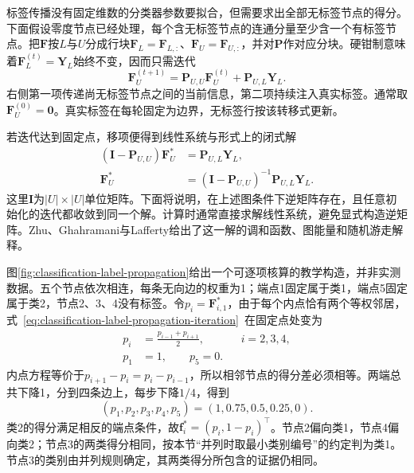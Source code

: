 标签传播没有固定维数的分类器参数要拟合，但需要求出全部无标签节点的得分。下面假设零度节点已经处理，每个含无标签节点的连通分量至少含一个有标签节点。把$\bm{F}$按$L$与$U$分成行块$\bm{F}_L=\bm{F}_{L,:}$、$\bm{F}_U=\bm{F}_{U,:}$，并对$\bm{P}$作对应分块。硬钳制意味着$\bm{F}_L^{(t)}=\bm{Y}_L$始终不变，因而只需迭代
\begin{equation}
  \label{eq:classification-label-propagation-iteration}
  \bm{F}_U^{(t+1)}
    =\bm{P}_{U,U}\bm{F}_U^{(t)}
     +\bm{P}_{U,L}\bm{Y}_L.
\end{equation}
右侧第一项传递尚无标签节点之间的当前信息，第二项持续注入真实标签。通常取$\bm{F}_U^{(0)}=\bm{0}$。真实标签在每轮固定为边界，无标签行按该转移式更新。

若迭代达到固定点，移项便得到线性系统与形式上的闭式解
\begin{equation}
  \label{eq:classification-label-propagation-solution}
  \begin{aligned}
    (\bm{I}-\bm{P}_{U,U})\bm{F}_U^\ast
      &=\bm{P}_{U,L}\bm{Y}_L,\\
    \bm{F}_U^\ast
      &=(\bm{I}-\bm{P}_{U,U})^{-1}
        \bm{P}_{U,L}\bm{Y}_L.
  \end{aligned}
\end{equation}
这里$\bm{I}$为$|U|\times|U|$单位矩阵。下面将说明，在上述图条件下逆矩阵存在，且任意初始化的迭代都收敛到同一个解。计算时通常直接求解线性系统，避免显式构造逆矩阵。Zhu、Ghahramani与Lafferty给出了这一解的调和函数、图能量和随机游走解释。

图\ref{fig:classification-label-propagation}给出一个可逐项核算的教学构造，并非实测数据。五个节点依次相连，每条无向边的权重为1；端点1固定属于类1，端点5固定属于类2，节点2、3、4没有标签。令$p_i=\bm{F}_{i,1}^\ast$，由于每个内点恰有两个等权邻居，式~\eqref{eq:classification-label-propagation-iteration}~在固定点处变为
\begin{equation}
  \label{eq:classification-label-propagation-path}
  \begin{aligned}
    p_i&=\frac{p_{i-1}+p_{i+1}}{2},
      &&i=2,3,4,\\
    p_1&=1,\qquad p_5=0.
  \end{aligned}
\end{equation}
内点方程等价于$p_{i+1}-p_i=p_i-p_{i-1}$，所以相邻节点的得分差必须相等。两端总共下降1，分到四条边上，每步下降$1/4$，得到
\[
  (p_1,p_2,p_3,p_4,p_5)
    =(1,0.75,0.5,0.25,0).
\]
类2的得分满足相反的端点条件，故$\bm{f}_i^\ast=(p_i,1-p_i)^\top$。节点2偏向类1，节点4偏向类2；节点3的两类得分相同，按本节“并列时取最小类别编号”的约定判为类1。节点3的类别由并列规则确定，其两类得分所包含的证据仍相同。

